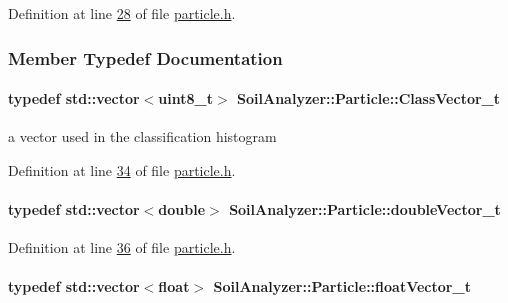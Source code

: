 Definition at line \hyperlink{particle_8h_source_l00028}{28} of file \hyperlink{particle_8h_source}{particle.\+h}.



\subsubsection{Member Typedef Documentation}
\hypertarget{class_soil_analyzer_1_1_particle_ad2038e90ac83a1cbd34a28e8fdefbfdc}{}
\paragraph[{Class\+Vector\+\_\+t}]{\setlength{\rightskip}{0pt plus 5cm}typedef std\+::vector$<$uint8\+\_\+t$>$ {\bf Soil\+Analyzer\+::\+Particle\+::\+Class\+Vector\+\_\+t}}\label{class_soil_analyzer_1_1_particle_ad2038e90ac83a1cbd34a28e8fdefbfdc}
a vector used in the classification histogram 

Definition at line \hyperlink{particle_8h_source_l00034}{34} of file \hyperlink{particle_8h_source}{particle.\+h}.

\hypertarget{class_soil_analyzer_1_1_particle_a4ae1bf667c41c7df60cc933e9e5f82eb}{}
\paragraph[{double\+Vector\+\_\+t}]{\setlength{\rightskip}{0pt plus 5cm}typedef std\+::vector$<$double$>$ {\bf Soil\+Analyzer\+::\+Particle\+::double\+Vector\+\_\+t}}\label{class_soil_analyzer_1_1_particle_a4ae1bf667c41c7df60cc933e9e5f82eb}


Definition at line \hyperlink{particle_8h_source_l00036}{36} of file \hyperlink{particle_8h_source}{particle.\+h}.

\hypertarget{class_soil_analyzer_1_1_particle_a712eef8db3e7bcb96b5fd3fb34f53fcb}{}
\paragraph[{float\+Vector\+\_\+t}]{\setlength{\rightskip}{0pt plus 5cm}typedef std\+::vector$<$float$>$ {\bf Soil\+Analyzer\+::\+Particle\+::float\+Vector\+\_\+t}}\label{class_soil_analyzer_1_1_particle_a712eef8db3e7bcb96b5fd3fb34f53fcb}


